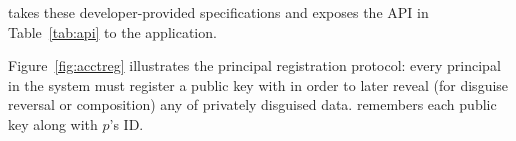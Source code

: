 \sys takes these developer-provided specifications and exposes the API in Table~\ref{tab:api} to the
application. 

Figure~\ref{fig:acctreg} illustrates the principal registration protocol: every principal in the
system must register a public key with \sys in order to later reveal (for disguise reversal or
composition) any of privately disguised data. \sys remembers each public key  along with
$p$'s ID.

\begin{figure*}[t!]
\caption{\textbf{Principal public key registration.}}
\label{fig:acctreg}
\end{figure*} 

